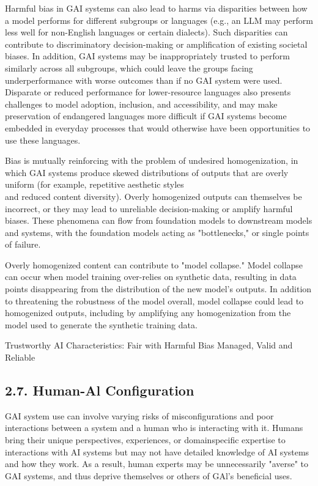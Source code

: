\documentclass[10pt]{article}
\begin{document}
Harmful bias in GAI systems can also lead to harms via disparities between how a model performs for different subgroups or languages (e.g., an LLM may perform less well for non-English languages or certain dialects). Such disparities can contribute to discriminatory decision-making or amplification of existing societal biases. In addition, GAI systems may be inappropriately trusted to perform similarly across all subgroups, which could leave the groups facing underperformance with worse outcomes than if no GAI system were used. Disparate or reduced performance for lower-resource languages also presents challenges to model adoption, inclusion, and accessibility, and may make preservation of endangered languages more difficult if GAI systems become embedded in everyday processes that would otherwise have been opportunities to use these languages.

Bias is mutually reinforcing with the problem of undesired homogenization, in which GAI systems produce skewed distributions of outputs that are overly uniform (for example, repetitive aesthetic styles\\
and reduced content diversity). Overly homogenized outputs can themselves be incorrect, or they may lead to unreliable decision-making or amplify harmful biases. These phenomena can flow from foundation models to downstream models and systems, with the foundation models acting as "bottlenecks," or single points of failure.

Overly homogenized content can contribute to "model collapse." Model collapse can occur when model training over-relies on synthetic data, resulting in data points disappearing from the distribution of the new model's outputs. In addition to threatening the robustness of the model overall, model collapse could lead to homogenized outputs, including by amplifying any homogenization from the model used to generate the synthetic training data.

Trustworthy AI Characteristics: Fair with Harmful Bias Managed, Valid and Reliable
\subsection*{2.7. Human-Al Configuration}
GAI system use can involve varying risks of misconfigurations and poor interactions between a system and a human who is interacting with it. Humans bring their unique perspectives, experiences, or domainspecific expertise to interactions with AI systems but may not have detailed knowledge of AI systems and how they work. As a result, human experts may be unnecessarily "averse" to GAI systems, and thus deprive themselves or others of GAl's beneficial uses.
\end{document}
